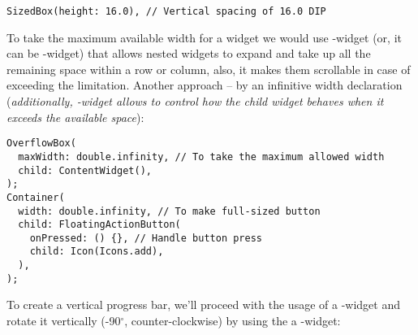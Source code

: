 \begin{lstlisting}
SizedBox(height: 16.0), // Vertical spacing of 16.0 DIP
\end{lstlisting}

\noindent To take the maximum available width for a widget we would use -widget (or, it can be 
-widget) that allows nested widgets to expand and take up all the remaining space within a row or column, 
also, it makes them scrollable in case of exceeding the limitation. Another approach -- by an infinitive width 
declaration (\emph{additionally, -widget allows to control how the child widget behaves when it 
exceeds the available space}):

\begin{lstlisting}
OverflowBox(
  maxWidth: double.infinity, // To take the maximum allowed width
  child: ContentWidget(),
);
Container(
  width: double.infinity, // To make full-sized button
  child: FloatingActionButton(
    onPressed: () {}, // Handle button press
    child: Icon(Icons.add),
  ),
);
\end{lstlisting}

\noindent To create a vertical progress bar, we'll proceed with the usage of a -widget and 
rotate it vertically (-90$^{\circ}$, counter-clockwise) by using the a -widget:

